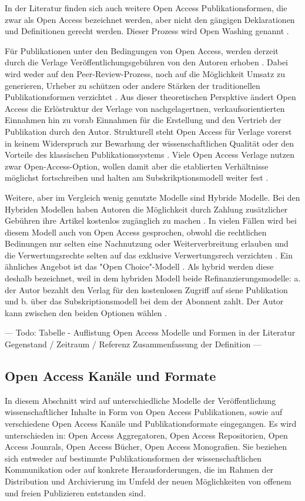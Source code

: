 In der Literatur \cite{suchen} finden sich auch weitere Open Access Publikationsformen, die zwar als Open Access bezeichnet werden, aber nicht den gängigen Deklarationen \cite{boai_2012} und Definitionen gerecht werden. Dieser Prozess wird Open Washing genannt \cite{suchen}. 

Für Publikationen unter den Bedingungen von Open Access, werden derzeit durch die Verlage Veröffentlichungsgebühren von den Autoren erhoben \cite{suchen}. Dabei wird weder auf den Peer-Review-Prozess, noch auf die Möglichkeit Umsatz zu generieren, Urheber zu schützen oder andere Stärken der traditionellen Publikationsformen verzichtet \cite{albert_2006_open_implications} \cite{Open_Access_net_2009}. Aus dieser theoretischen Perspktive ändert Open Access die Erlöstruktur der Verlage von nachgelagertnen, verkaufsorientierten Einnahmen hin zu vorab Einnahmen für die Erstellung und den Vertrieb der Publikation durch den Autor. Strukturell steht Open Access für Verlage vorerst in keinem Widerspruch zur Bewarhung der wissenschaftlichen Qualität oder den Vorteile des klassischen Publikationssystems \cite{Suber_2002}. Viele Open Access Verlage nutzen zwar Open-Access-Option, wollen damit aber die etablierten Verhältnisse möglichst fortschreiben und halten am Subskrikptionsmodell weiter fest \cite{schmidt_2007_goldenen}.

Weitere, aber im Vergleich wenig genutzte Modelle sind Hybride Modelle. Bei den Hybriden Modellen haben Autoren die Möglichkeit durch Zahlung zusätzlicher Gebühren ihre Artikel kostenlos zugänglich zu machen \cite{muller_2010_open}. In vielen Fällen wird bei diesem Modell auch von Open Access gesprochen, obwohl die rechtlichen Bedinungen nur selten eine Nachnutzung oder Weiterverbreitung erlauben und die Verwertungsrechte selten auf das exklusive Verwertungsrech verzichten \cite{muller_2010_open}. Ein ähnliches Angebot ist das "Open Choice"-Modell \cite{Hess_2006}. Als hybrid werden diese deshalb bezeichnet, weil in dem hybriden Modell beide Refinanzierungsmodelle: a. der Autor bezahlt den Verlag für den kostenlosen Zugriff auf siene Publikation und b. über das Subskriptionsmodell bei dem der Abonnent zahlt. Der Autor kann zwischen den beiden Optionen wählen \cite{muller_2010_open}.

--- Todo: Tabelle - Auflistung Open Access  Modelle und Formen in der Literatur  
Gegenstand / Zeitraum / Referenz
Zusammenfassung der Definition --- 

\subsection{Open Access Kanäle und Formate}
In diesem Abschnitt wird auf unterschiedliche Modelle der Veröffentlichung wissenschaftlicher Inhalte in Form von Open Access Publikationen, sowie auf verschiedene Open Access Kanäle und Publikationsformate eingegangen. Es wird unterschieden in: Open Access Aggregatoren, Open Access Repositorien, Open Access Jounrals, Open Access Bücher, Open Access Monografien. Sie beziehen sich entweder auf bestimmte Publikationsformen der wissenschaftlichen Kommunikation oder auf konkrete Herausforderungen, die im Rahmen der Distribution und Archivierung im Umfeld der neuen Möglichkeiten von offenem und freien Publizieren entstanden sind. 

